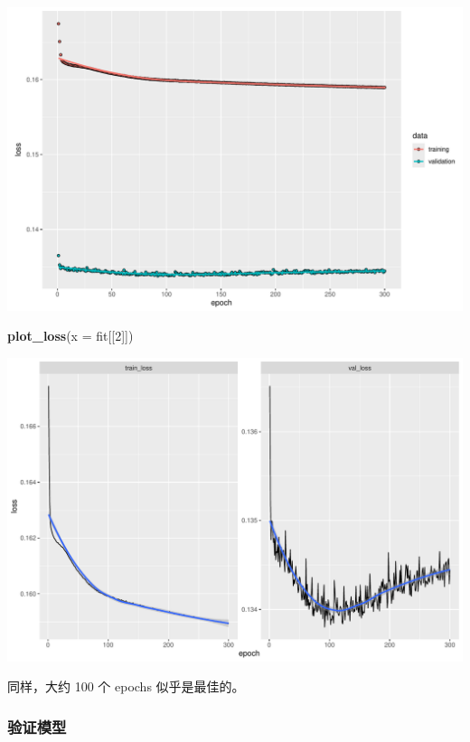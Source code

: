 \documentclass[
]{article}
\newenvironment{Shaded}{\begin{snugshade}}{\end{snugshade}}
\newcommand{\AttributeTok}[1]{\textcolor[rgb]{0.13,0.29,0.53}{#1}}
\newcommand{\DecValTok}[1]{\textcolor[rgb]{0.00,0.00,0.81}{#1}}
\newcommand{\FunctionTok}[1]{\textcolor[rgb]{0.13,0.29,0.53}{\textbf{#1}}}
\newcommand{\NormalTok}[1]{#1}
\begin{document}
\includegraphics{freMTPLfreq_fnn-zh-cn_files/figure-latex/unnamed-chunk-54-1.pdf}

\begin{Shaded}
\begin{Highlighting}[]
\FunctionTok{plot\_loss}\NormalTok{(}\AttributeTok{x =}\NormalTok{ fit[[}\DecValTok{2}\NormalTok{]])}
\end{Highlighting}
\end{Shaded}

\includegraphics{freMTPLfreq_fnn-zh-cn_files/figure-latex/unnamed-chunk-55-1.pdf}

同样，大约 100 个 epochs 似乎是最佳的。

\subsubsection{验证模型}\label{ux9a8cux8bc1ux6a21ux578b-2}
\end{document}
